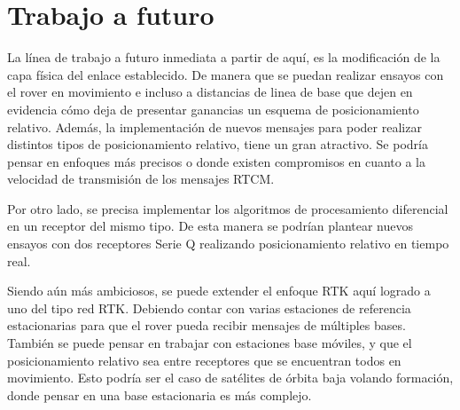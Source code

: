 \documentclass[a4paper,12pt,oneside,onecolumn,final,openright]{book}%
\begin{document}
\section*{Trabajo a futuro}
	La línea de trabajo a futuro inmediata a partir de aquí, es la modificación de la capa física del enlace establecido. De manera que se puedan realizar ensayos con el rover en movimiento e incluso a distancias de linea de base que dejen en evidencia cómo deja de presentar ganancias un esquema de posicionamiento relativo. Además, la implementación de nuevos mensajes para poder realizar distintos tipos de posicionamiento relativo, tiene un gran atractivo. Se podría pensar en enfoques más precisos o donde existen compromisos en cuanto a la velocidad de transmisión de los mensajes RTCM.
	
	Por otro lado, se precisa implementar los algoritmos de procesamiento diferencial en un receptor del mismo tipo. De esta manera se podrían plantear nuevos ensayos con dos receptores Serie Q realizando posicionamiento relativo en tiempo real. 
	
	Siendo aún más ambiciosos, se puede extender el enfoque RTK aquí logrado a uno del tipo red RTK. Debiendo contar con varias estaciones de referencia estacionarias para que el rover pueda recibir mensajes de múltiples bases. También se puede pensar en trabajar con estaciones base móviles, y que el posicionamiento relativo sea entre receptores que se encuentran todos en movimiento. Esto podría ser el caso de satélites de órbita baja volando formación, donde pensar en una base estacionaria es más complejo.
\end{document}
